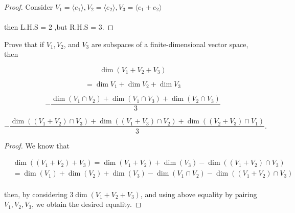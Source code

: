 \documentclass{extarticle}
\begin{document}
\begin{proof}
    Consider $V_{1} = \langle e_{1} \rangle, V_{2} = \langle e_{2} \rangle, V_{3} = \langle e_{1}+e_{2} \rangle $ \\ \\
    then L.H.S = 2 ,but R.H.S = 3.
\end{proof}
\begin{problem}{20}
    Prove that if \( V_1, V_2 \), and \( V_3 \) are subspaces of a finite-dimensional vector space, then

\[
\dim(V_1 + V_2 + V_3)
\]

\[
= \dim V_1 + \dim V_2 + \dim V_3
\]

\[
- \frac{\dim(V_1 \cap V_2) + \dim(V_1 \cap V_3) + \dim(V_2 \cap V_3)}{3}
\]

\[
- \frac{\dim((V_1 + V_2) \cap V_3) + \dim((V_1 + V_3) \cap V_2) + \dim((V_2 + V_3) \cap V_1)}{3}.
\]

\end{problem}

\begin{proof}
We know that 

\begin{align*}
&\dim ((V_1 + V_2) + V_3) = \dim(V_1 + V_2) + \dim(V_3) - \dim((V_1 + V_2)\cap V_3) \\ 
&= \dim (V_1) + \dim (V_2) + \dim (V_3) - \dim(V_1 \cap V_2) - \dim((V_1 + V_2)\cap V_3)
\end{align*}\\

then, by considering $3\dim(V_{1}+V_{2}+V_{3})$,
and using above equality by pairing $V_{1},V_{2},V_{3}$, we obtain the desired equality.



\end{proof}
\end{document}
